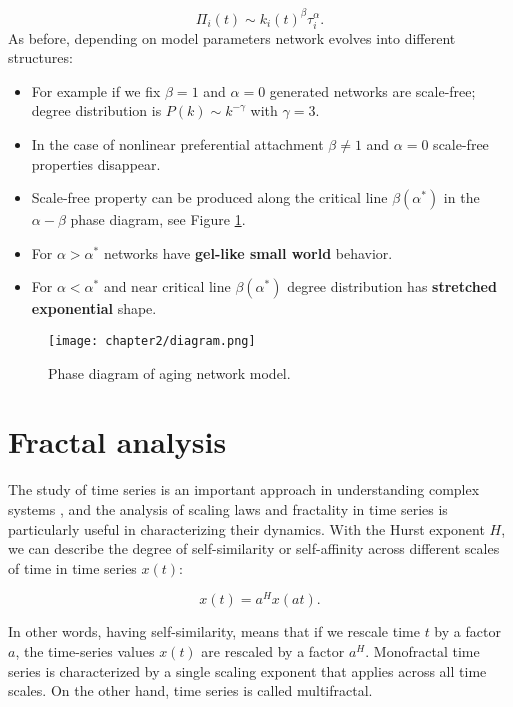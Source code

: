 \begin{equation}
\Pi_{i}(t)\sim k_{i}(t)^{\beta}\tau_{i}^{\alpha}.
\label{eq:1}
\end{equation}
\newpage
As before, depending on model parameters network evolves into different structures:  
\begin{itemize}
	\item For example if we fix $\beta=1$ and $\alpha=0$ generated networks are scale-free; degree distribution is $P(k) \sim k^{-\gamma}$ with $\gamma=3$.
	\item In the case of nonlinear preferential attachment $\beta \neq 1$ and $\alpha=0$ scale-free properties disappear. 
	\item Scale-free property can be produced along the critical line $\beta(\alpha^{*})$ in the $\alpha-\beta$ phase diagram, see Figure \ref{fig:diagram}.
	
	\item For $\alpha>\alpha^{*}$ networks have \textbf{gel-like small world} behavior.
	
	\item For $\alpha<\alpha^{*}$ and near critical line $\beta(\alpha^{*})$ degree distribution has \textbf{stretched exponential} shape.
	
\end{itemize}

\begin{figure}[h]
	\centering
	\texttt{[image: chapter2/diagram.png]}
	\caption[Phase diagram of aging network model.]{Phase diagram of aging network model.}
	\label{fig:diagram}
\end{figure}

\newpage

\section{Fractal analysis}

The study of time series is an important approach in understanding complex systems \cite{kantelhardt2008fractal}, and the analysis of scaling laws and fractality in time series is particularly useful in characterizing their dynamics. With the Hurst exponent $H$, we can describe the degree of self-similarity or self-affinity across different scales of time in time series $x(t)$:

$$x(t) = a^Hx(at).$$

In other words, having self-similarity, means that if we rescale time $t$ by a factor $a$, the time-series values $x(t)$ are rescaled by a factor $a^H$.
Monofractal \cite{fan2012fractal, sidorov2018fractality} time series is characterized by a single scaling exponent that applies across all time scales. On the other hand, time series is called multifractal. 

